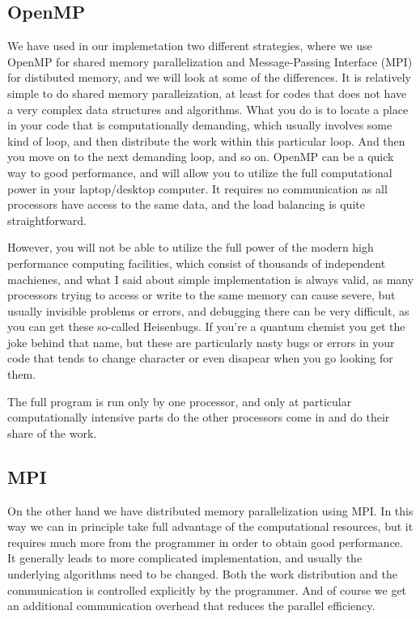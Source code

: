 \documentclass [a4paper]{report}
\begin{document}
\subsection*{OpenMP}
We have used in our implemetation two different strategies, where we use OpenMP for shared 
memory parallelization and Message-Passing Interface (MPI) for distibuted memory, and we will
look at some of the differences. It is relatively simple to do shared memory paralleization,
at least for codes that does not have a very complex data structures and algorithms. What you do
is to locate a place in your code that is computationally demanding, which usually involves
some kind of loop, and then distribute the work within this particular loop. And then you move
on to the next demanding loop, and so on. OpenMP can be a 
quick way to good performance, and will allow you to utilize the full computational power in
your laptop/desktop computer. It requires no communication as all processors have access to the 
same data, and the load balancing is quite straightforward.

However, you will not be able to utilize the full power of the modern high performance
computing facilities, which consist of thousands of independent machienes, and what I said
about simple implementation is always valid, as many processors trying to access or write to
the same memory can cause severe, but usually invisible problems or errors, and debugging
there can be very difficult, as you can get these so-called Heisenbugs. If you're a quantum 
chemist you get the joke behind that name, but these are 
particularly nasty bugs or errors in your code that tends to change character or even disapear
when you go looking for them.

The full program is run only by one processor, and only at particular computationally 
intensive parts do the other processors come in and do their share of the work.

\subsection*{MPI}
On the other hand we have distributed memory parallelization using MPI. In this way we can
in  principle take full advantage of the computational resources, but it requires much more
from the programmer in order to obtain good performance. It generally leads to more complicated 
implementation, and usually the underlying algorithms need to be changed. Both the work 
distribution and the communication is controlled explicitly by the programmer. And of course
we get an additional communication overhead that reduces the parallel efficiency.
\end{document}
